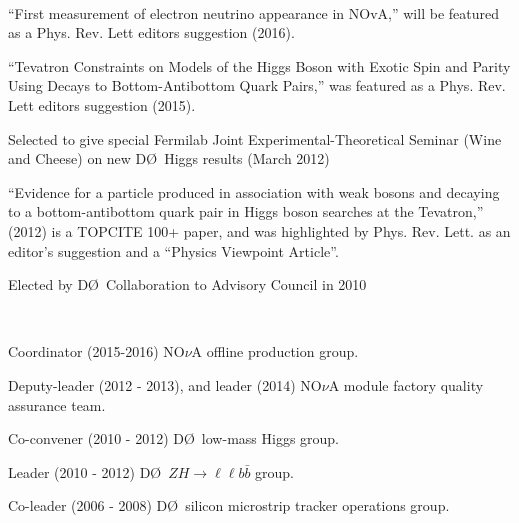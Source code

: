 \documentclass[amsmath,amssymb]{revtex4}
\def\dzero{D\O}
\begin{document}
\\
\begin{list}{}
            {\setlength{\itemsep}{0.0in}\setlength{\parsep}{0.0in}
             \addtolength{\parskip}{-0.5in}}
\item ``First measurement of electron neutrino appearance in NOvA,'' will be featured as a Phys. Rev.
Lett editors suggestion (2016).
\item ``Tevatron Constraints  on Models of the Higgs Boson with Exotic Spin and Parity Using Decays to
        Bottom-Antibottom Quark Pairs,'' was featured as a  Phys. Rev. Lett editors suggestion (2015).
\item Selected to give special Fermilab Joint Experimental-Theoretical Seminar (Wine and Cheese)
      on new \dzero~Higgs results (March 2012)
\item  ``Evidence for a particle produced in association with weak bosons and decaying to a
        bottom-antibottom quark pair in Higgs boson searches at the Tevatron,'' (2012) is a TOPCITE 100+ paper, and
        was highlighted by Phys. Rev. Lett. as an editor's suggestion and a ``Physics Viewpoint Article''.
\item Elected by \dzero~Collaboration to Advisory Council in 2010
\end{list}
\vspace{\baselineskip}

\\
\begin{list}{}
            {\setlength{\itemsep}{0.0in}\setlength{\parsep}{0.0in}
             \addtolength{\parskip}{-0.5in}}
\item Coordinator (2015-2016)  NO$\nu$A offline production group.
\item Deputy-leader (2012 - 2013), and leader (2014) NO$\nu$A module factory quality assurance team.
\item Co-convener (2010 - 2012) \dzero~low-mass Higgs group.
\item Leader (2010 - 2012) \dzero~$ZH\to\ell\ell b\bar{b}$ group.
\item Co-leader (2006 - 2008) \dzero~silicon microstrip tracker operations group.
\end{list}
\vspace{\baselineskip}
\end{document}
